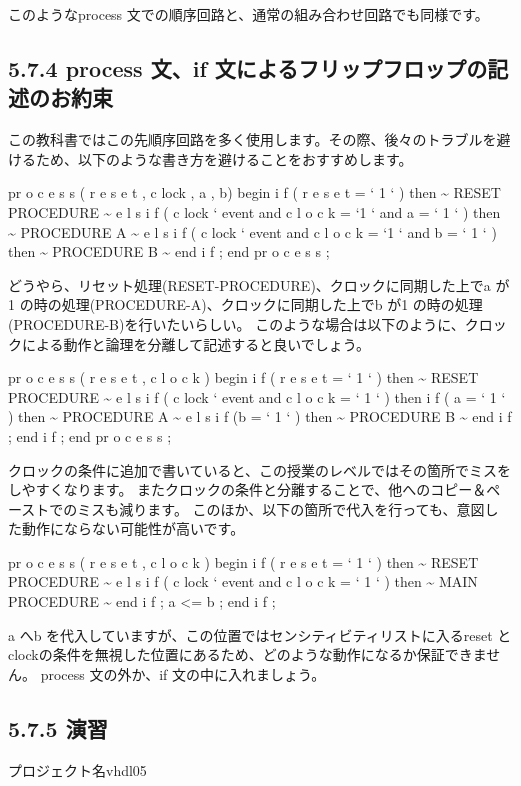 \documentclass[letterpaper,10pt,dvipdfmx]{sphinxmanual}
\begin{document}
このようなprocess 文での順序回路と、通常の組み合わせ回路でも同様です。


\subsection{5.7.4 process 文、if 文によるフリップフロップの記述のお約束}
\label{05_try:process-if}
この教科書ではこの先順序回路を多く使用します。その際、後々のトラブルを避けるため、以下のような書き方を避けることをおすすめします。

pr o c e s s ( r e s e t , c lock , a , b)
begin
i f ( r e s e t = ` 1 ` ) then
\textasciitilde{} RESET PROCEDURE \textasciitilde{}
e l s i f ( c lock ` event and c l o c k = `1 ` and a = ` 1 ` ) then
\textasciitilde{} PROCEDURE A \textasciitilde{}
e l s i f ( c lock ` event and c l o c k = `1 ` and b = ` 1 ` ) then
\textasciitilde{} PROCEDURE B \textasciitilde{}
end i f ;
end pr o c e s s ;

どうやら、リセット処理(RESET-PROCEDURE)、クロックに同期した上でa が1 の時の処理(PROCEDURE-A)、クロックに同期した上でb が1 の時の処理(PROCEDURE-B)を行いたいらしい。
このような場合は以下のように、クロックによる動作と論理を分離して記述すると良いでしょう。

pr o c e s s ( r e s e t , c l o c k )
begin
i f ( r e s e t = ` 1 ` ) then
\textasciitilde{} RESET PROCEDURE \textasciitilde{}
e l s i f ( c lock ` event and c l o c k = ` 1 ` ) then
i f ( a = ` 1 ` ) then
\textasciitilde{} PROCEDURE A \textasciitilde{}
e l s i f (b = ` 1 ` ) then
\textasciitilde{} PROCEDURE B \textasciitilde{}
end i f ;
end i f ;
end pr o c e s s ;

クロックの条件に追加で書いていると、この授業のレベルではその箇所でミスをしやすくなります。
またクロックの条件と分離することで、他へのコピー＆ペーストでのミスも減ります。
このほか、以下の箇所で代入を行っても、意図した動作にならない可能性が高いです。

pr o c e s s ( r e s e t , c l o c k )
begin
i f ( r e s e t = ` 1 ` ) then
\textasciitilde{} RESET PROCEDURE \textasciitilde{}
e l s i f ( c lock ` event and c l o c k = ` 1 ` ) then
\textasciitilde{} MAIN PROCEDURE \textasciitilde{}
end i f ;
a \textless{}= b ;
end i f ;

a へb を代入していますが、この位置ではセンシティビティリストに入るreset とclockの条件を無視した位置にあるため、どのような動作になるか保証できません。
process 文の外か、if 文の中に入れましょう。


\subsection{5.7.5 演習}
\label{05_try:id12}
プロジェクト名vhdl05
\end{document}
